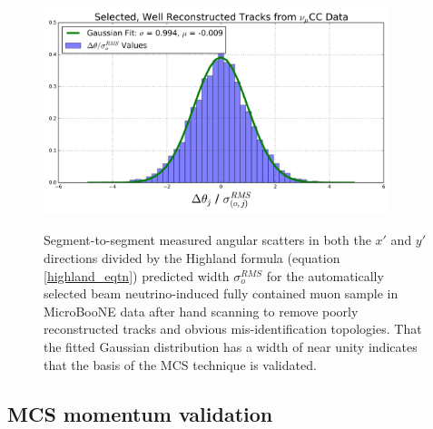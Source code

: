 \documentclass[a4paper,11pt]{article}
\begin{document}
\begin{figure}[ht!]
\centering
	\includegraphics[width=0.9\textwidth]{Figures/Highland_validation_DataBNBSelectedRecoTrack_goodscan.png} \\
\caption{Segment-to-segment measured angular scatters in both the $x'$ and $y'$ directions divided by the Highland formula (equation \ref{highland_eqtn}) predicted width $\sigma_o^{RMS}$ for the automatically selected beam neutrino-induced fully contained muon sample in MicroBooNE data after hand scanning to remove poorly reconstructed tracks and obvious mis-identification topologies. That the fitted Gaussian distribution has a width of near unity indicates that the basis of the MCS technique is validated.}\label{Highland_validation_fig}
\end{figure}


\subsection{MCS momentum validation}\label{MCS_Momentum_Validation_DataRecoTrack_section}
\end{document}
